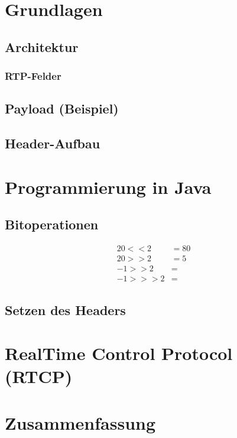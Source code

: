 \section{Grundlagen}
\subsection{Architektur}
\subsubsection*{RTP-Felder}
\subsection{Payload (Beispiel)}
\subsection{Header-Aufbau}
\section{Programmierung in Java}
\subsection{Bitoperationen}
\begin{align*}
20 << 2 &= 80\\
20 >> 2 &= 5\\
-1 >> 2 &= \\
-1 >>> 2 &=
\end{align*}
\subsection{Setzen des Headers}

\section{RealTime Control Protocol (RTCP)}

\section{Zusammenfassung}






